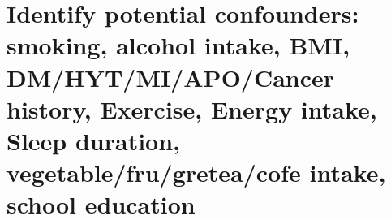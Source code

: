 \documentclass[]{article}
\newenvironment{Shaded}{\begin{snugshade}}{\end{snugshade}}
\newcommand{\DataTypeTok}[1]{\textcolor[rgb]{0.13,0.29,0.53}{#1}}
\newcommand{\DecValTok}[1]{\textcolor[rgb]{0.00,0.00,0.81}{#1}}
\newcommand{\FloatTok}[1]{\textcolor[rgb]{0.00,0.00,0.81}{#1}}
\newcommand{\KeywordTok}[1]{\textcolor[rgb]{0.13,0.29,0.53}{\textbf{#1}}}
\newcommand{\NormalTok}[1]{#1}
\newcommand{\OperatorTok}[1]{\textcolor[rgb]{0.81,0.36,0.00}{\textbf{#1}}}
\newcommand{\OtherTok}[1]{\textcolor[rgb]{0.56,0.35,0.01}{#1}}
\newcommand{\StringTok}[1]{\textcolor[rgb]{0.31,0.60,0.02}{#1}}
\begin{document}
\begin{Shaded}
\end{Shaded}

\hypertarget{identify-potential-confounders-smoking-alcohol-intake-bmi-dmhytmiapocancer-history-exercise-energy-intake-sleep-duration-vegetablefrugreteacofe-intake-school-education}{%
\section{Identify potential confounders: smoking, alcohol intake, BMI,
DM/HYT/MI/APO/Cancer history, Exercise, Energy intake, Sleep duration,
vegetable/fru/gretea/cofe intake, school
education}\label{identify-potential-confounders-smoking-alcohol-intake-bmi-dmhytmiapocancer-history-exercise-energy-intake-sleep-duration-vegetablefrugreteacofe-intake-school-education}}
\end{document}
